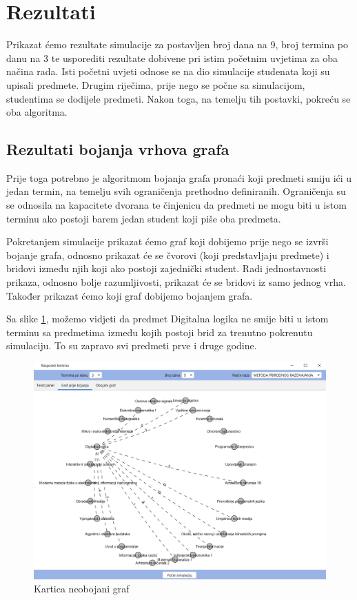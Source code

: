 \documentclass[times, utf8, zavrsni, numeric]{fer}
\begin{document}
\newpage
\section{Rezultati}
Prikazat ćemo rezultate simulacije za postavljen broj dana na 9, broj termina po danu na 3 te usporediti rezultate dobivene pri istim početnim uvjetima za oba načina rada. Isti početni uvjeti odnose se na dio simulacije studenata koji su upisali predmete. Drugim riječima, prije nego se počne sa simulacijom, studentima se dodijele predmeti. Nakon toga, na temelju tih postavki, pokreću se oba algoritma.\\

\subsection{Rezultati bojanja vrhova grafa}
Prije toga potrebno je algoritmom bojanja grafa pronaći koji predmeti smiju ići u jedan termin, na temelju svih ograničenja prethodno definiranih. Ograničenja su se odnosila na kapacitete dvorana te činjenicu da predmeti ne mogu biti u istom terminu ako postoji barem jedan student koji piše oba predmeta.\par
Pokretanjem simulacije prikazat ćemo graf koji dobijemo prije nego se izvrši bojanje grafa, odnosno prikazat će se čvorovi (koji predstavljaju predmete) i bridovi između njih koji ako postoji zajednički student. Radi jednostavnosti prikaza, odnosno bolje razumljivosti, prikazat će se bridovi iz samo jednog vrha. Također prikazat ćemo koji graf dobijemo bojanjem grafa.

Sa slike \ref{fig:neobojani-graf}, možemo vidjeti da predmet Digitalna logika ne smije biti u istom terminu sa predmetima između kojih postoji brid za trenutno pokrenutu simulaciju. To su zapravo svi predmeti prve i druge godine.

\begin{figure}[h!]
	\centering
	\includegraphics[width=\textwidth]{slike/neobojaniGraf.png}
	\caption{Kartica neobojani graf}
	\label{fig:neobojani-graf}
\end{figure}
\end{document}
